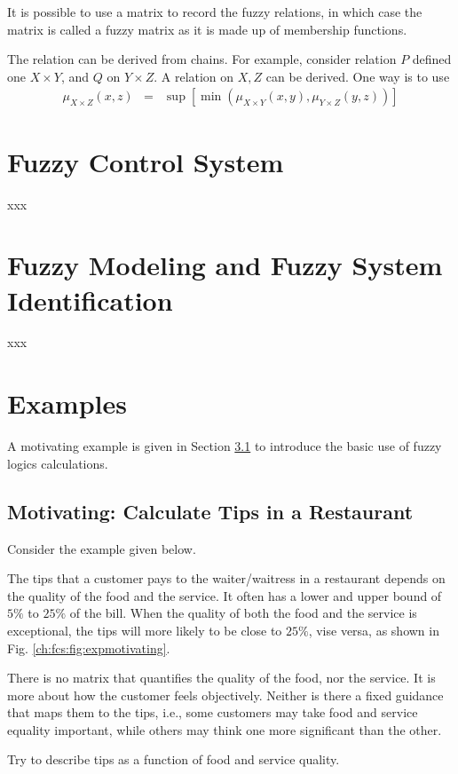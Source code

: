 It is possible to use a matrix to record the fuzzy relations, in which case the matrix is called a fuzzy matrix as it is made up of membership functions.

The relation can be derived from chains. For example, consider relation $P$ defined one $X \times Y$, and $Q$ on $Y \times Z$. A relation on $X, Z$ can be derived. One way is to use
\begin{eqnarray}
	\mu_{X \times Z}(x, z) &=& \sup \left[\min\left(\mu_{X\times Y}(x, y), \mu_{Y\times Z} (y, z)\right)\right] \nonumber
\end{eqnarray} 



\section{Fuzzy Control System}

xxx

\section{Fuzzy Modeling and Fuzzy System Identification}

xxx

\section{Examples}

A motivating example is given in Section \ref{ch:fcs:sec:example:subsec:motivating} to introduce the basic use of fuzzy logics calculations.

\subsection{Motivating: Calculate Tips in a Restaurant} \label{ch:fcs:sec:example:subsec:motivating}

Consider the example given below.

\begin{shortbox}

The tips that a customer pays to the waiter/waitress in a restaurant depends on the quality of the food and the service. It often has a lower and upper bound of $5\%$ to $25\%$ of the bill. When the quality of both the food and the service is exceptional, the tips will more likely to be close to $25\%$, vise versa, as shown in Fig. \ref{ch:fcs:fig:expmotivating}.

There is no matrix that quantifies the quality of the food, nor the service. It is more about how the customer feels objectively. Neither is there a fixed guidance that maps them to the tips, i.e., some customers may take food and service equality important, while others may think one more significant than the other.

Try to describe tips as a function of food and service quality.

\end{shortbox}


